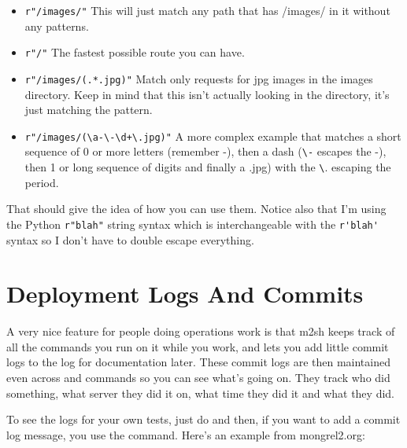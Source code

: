 \begin{itemize}
\item \verb|r"/images/"|  This will just match any path that has /images/ in it without any patterns.
\item \verb|r"/"| The fastest possible route you can have.
\item \verb|r"/images/(.*.jpg)"| Match only requests for jpg images in the images directory.  Keep in mind that this
    isn't actually looking in the directory, it's just matching the  pattern.
\item \verb|r"/images/(\a-\-\d+\.jpg)"| A more complex example that matches a short sequence of 0 or more letters (remember -), then a dash
    (\verb|\-| escapes the -), then 1 or long sequence of digits and finally a .jpg) with the \verb|\|. escaping the period.
\end{itemize}

That should give the idea of how you can use them.  Notice also that I'm using the Python \verb|r"blah"| string syntax which is
interchangeable with the \verb|r'blah'| syntax so I don't have to double escape everything.


\section{Deployment Logs And Commits}

A very nice feature for people doing operations work is that m2sh keeps track of all the
commands you run on it while you work, and lets you add little commit logs to the
log for documentation later.  These commit logs are then maintained even across
 and  commands so you can see what's going on.  They
track who did something, what server they did it on, what time they did it and what they
did.

To see the logs for your own tests, just do  and then,
if you want to add a commit log message, you use the  command.
Here's an example from mongrel2.org:

